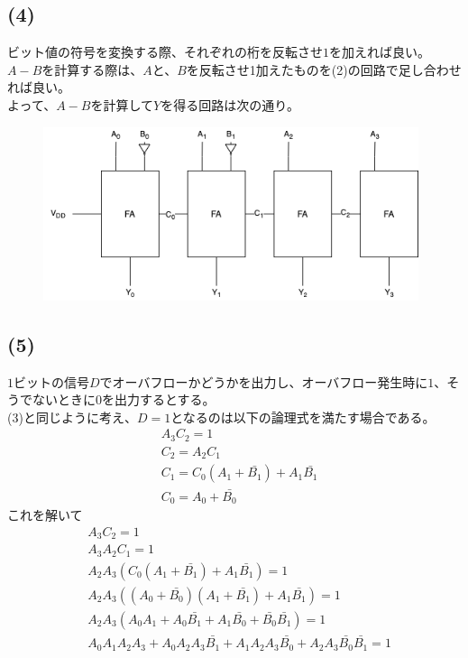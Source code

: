 \documentclass[a4paper,12pt,xelatex,ja=standard]{bxjsarticle}
\begin{document}
  \subsection*{(4)}
  ビット値の符号を変換する際、それぞれの桁を反転させ$1$を加えれば良い。$A-B$を計算する際は、$A$と、$B$を反転させ1加えたものを(2)の回路で足し合わせれば良い。\\
  よって、$A-B$を計算して$Y$を得る回路は次の通り。
  \begin{figure}[H]
    \centering
    \includegraphics[width=11cm]{images/ripple_carry_subtractor.png}
  \end{figure}

  \subsection*{(5)}
  $1$ビットの信号$D$でオーバフローかどうかを出力し、オーバフロー発生時に$1$、そうでないときに$0$を出力するとする。\\
  (3)と同じように考え、$D=1$となるのは以下の論理式を満たす場合である。
  \begin{equation*}
    \begin{split}
      &A_3 C_2 = 1 \\
      &C_2 = A_2 C_1 \\
      &C_1 = C_0 (A_1 + \bar{B_1}) + A_1 \bar{B_1} \\
      &C_0 = A_0 + \bar{B_0}
    \end{split}
  \end{equation*}
  これを解いて
  \begin{equation*}
    \begin{split}
      &A_3 C_2 = 1 \\
      &A_3 A_2 C_1 = 1 \\
      &A_2 A_3 (C_0(A_1 + \bar{B_1}) + A_1 \bar{B_1}) = 1 \\
      &A_2 A_3 ((A_0 + \bar{B_0})(A_1 + \bar{B_1}) + A_1 \bar{B_1}) = 1 \\
      &A_2 A_3 (A_0A_1 + A_0 \bar{B_1} + A_1\bar{B_0} + \bar{B_0} \bar{B_1}) = 1 \\
      &A_0A_1A_2A_3 + A_0A_2A_3\bar{B_1} + A_1A_2A_3\bar{B_0} + A_2A_3\bar{B_0}\bar{B_1} = 1 \\
    \end{split}
  \end{equation*}
\end{document}
